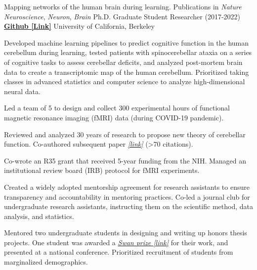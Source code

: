 

\begin{cventries}

  \cventry
  	{Mapping networks of the human brain during learning. Publications in \textit{Nature Neuroscience}, \textit{Neuron}, \textit{Brain}}
    {Ph.D. Graduate Student Researcher (2017-2022)} %
    {\href{https://github.com/maedbhk/cerebellum_learning_connect}{\textbf{Github [Link]}}}
    {University of California, Berkeley} %
    {
      \begin{cvitems} %
        \item {Developed machine learning pipelines to predict cognitive function in the human cerebellum during learning, tested patients with spinocerebellar ataxia on a series of cognitive tasks to assess cerebellar deficits, and analyzed post-mortem brain data to create a transcriptomic map of the human cerebellum. Prioritized taking classes in advanced statistics and computer science to analyze high-dimensional neural data.} 
        \item {Led a team of 5 to design and collect 300 experimental hours of functional magnetic resonance imaging (fMRI) data (during COVID-19 pandemic).}
		\item {Reviewed and analyzed 30 years of research to propose new theory of cerebellar function. Co-authored subsequent paper \href{https://www.sciencedirect.com/science/article/pii/S0896627319303782}{\textit{[link]}} (>70 citations).}
        \item {Co-wrote an R35 grant that received 5-year funding from the NIH. Managed an institutional review board (IRB) protocol for fMRI experiments.}
        \item {Created a widely adopted mentorship agreement for research assistants to ensure transparency and accountability in mentoring practices. Co-led a journal club for undergraduate research assistants, instructing them on the scientific method, data analysis, and statistics.}
        \item {Mentored two undergraduate students in designing and writing up honors thesis projects. One student was awarded a \href{https://psychology.berkeley.edu/sites/default/files/undergraduate-program/swanaward_application_2019-2020.pdf}{\textit{Swan prize [link]}} for their work, and presented at a national conference. Prioritized recruitment of students from marginalized demographics.}
      \end{cvitems}
    }
    

\end{cventries}
